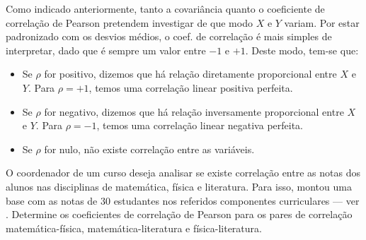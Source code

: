 Como indicado anteriormente, tanto a covariância quanto o coeficiente de
correlação de Pearson pretendem investigar de que modo $X$ e $Y$ variam. Por
estar padronizado com os desvios médios, o coef. de correlação é mais simples
de interpretar, dado que é sempre um valor entre $-1$ e $+1$. Deste modo,
tem-se que:
\begin{itemize}
    \item Se $\rho$ for positivo, dizemos que há relação diretamente
    proporcional entre $X$ e $Y$. Para $\rho=+1$, temos uma correlação linear
    positiva perfeita.
    \item Se $\rho$ for negativo, dizemos que há relação inversamente
    proporcional entre $X$ e $Y$. Para $\rho=-1$, temos uma correlação linear
    negativa perfeita.
\item Se $\rho$ for nulo, não existe correlação entre as variáveis.
\end{itemize}

\begin{eg}
O coordenador de um curso deseja analisar se existe correlação entre as
notas dos alunos nas disciplinas de matemática, física e literatura. Para
isso, montou uma base com as notas de 30 estudantes nos referidos
componentes curriculares --- ver .
Determine os coeficientes de correlação de Pearson para os pares de
correlação matemática-física, matemática-literatura e física-literatura.
\end{eg}

